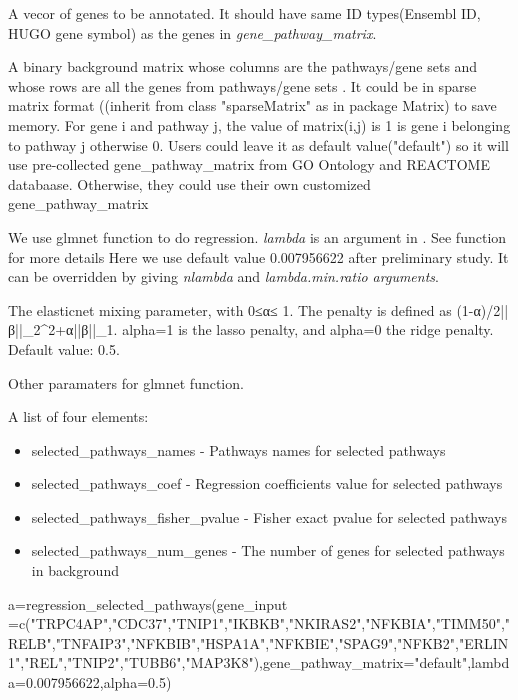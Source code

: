 \documentclass[a4paper]{book}
\begin{document}
\begin{Arguments}
\begin{ldescription}
\item[\code{gene\_input}] A vecor of genes to be annotated. It should have same ID types(Ensembl ID, HUGO gene symbol) as the genes in \emph{gene\_pathway\_matrix}.

\item[\code{gene\_pathway\_matrix}] A binary background matrix whose columns are the pathways/gene sets and 
whose rows are all the genes from pathways/gene sets . It could be in sparse matrix format ((inherit from class "sparseMatrix" as in package Matrix) to save memory.
For gene i and pathway j, the value of matrix(i,j) is 1 is gene i belonging to pathway j otherwise 0.
Users could leave it as default value("default") so it will use pre-collected gene\_pathway\_matrix from GO Ontology and REACTOME databaase.
Otherwise, they could use their own customized gene\_pathway\_matrix

\item[\code{lambda}] We use glmnet function to do regression. \emph{lambda} is an argument in . See  function for more details
Here we use default value 0.007956622 after preliminary study. It can be overridden by giving \emph{nlambda} and \emph{lambda.min.ratio arguments}.

\item[\code{alpha}] The elasticnet mixing parameter, with 0≤α≤ 1. The penalty is defined as
(1-α)/2||β||\_2\textasciicircum{}2+α||β||\_1.
alpha=1 is the lasso penalty, and alpha=0 the ridge penalty. Default value: 0.5.

\item[\code{...}] Other paramaters for glmnet function.
\end{ldescription}
\end{Arguments}
%
\begin{Value}
A list of four elements: 
\begin{itemize}

\item selected\_pathways\_names - Pathways names for selected pathways
\item selected\_pathways\_coef - Regression coefficients value for selected pathways
\item selected\_pathways\_fisher\_pvalue - Fisher exact pvalue for selected pathways
\item selected\_pathways\_num\_genes - The number of genes for selected pathways in background

\end{itemize}

\end{Value}
%
\begin{Examples}
\begin{ExampleCode}
a=regression_selected_pathways(gene_input =c("TRPC4AP","CDC37","TNIP1","IKBKB","NKIRAS2","NFKBIA","TIMM50","RELB","TNFAIP3","NFKBIB","HSPA1A","NFKBIE","SPAG9","NFKB2","ERLIN1","REL","TNIP2","TUBB6","MAP3K8"),gene_pathway_matrix="default",lambda=0.007956622,alpha=0.5)
\end{ExampleCode}
\end{Examples}
\printindex{}
\end{document}
